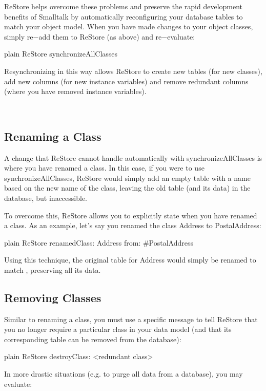 \documentclass[10pt,twoside,english]{_support/latex/sbabook/sbabook}
\begin{document}
ReStore helps overcome these problems and preserve the rapid development benefits of Smalltalk by automatically reconfiguring your database tables to match your object model. When you have made changes to your object classes, simply re−add them to ReStore (as above) and re−evaluate:

\begin{displaycode}{plain}
	ReStore synchronizeAllClasses
\end{displaycode}

Resynchronizing in this way allows ReStore to create new tables (for new classes), add new columns (for new instance variables) and remove redundant columns (where you have removed instance variables). 

 
\subsection{Renaming a Class}
A change that ReStore cannot handle automatically with synchronizeAllClasses is where you have renamed a class. In this case, if you were to use synchronizeAllClasses, ReStore would simply add an empty table with a name based on the new name of the class, leaving the old table (and its data) in the database, but inaccessible. 

To overcome this, ReStore allows you to explicitly state when you have renamed a class. As an example, let's say you renamed the class Address to PostalAddress:

\begin{displaycode}{plain}
	ReStore renamedClass: Address from: #PostalAddress
\end{displaycode}

Using this technique, the original table for Address would simply be renamed to match
, preserving all its data.
\subsection{Removing Classes}
Similar to renaming a class, you must use a specific message to tell ReStore that you no longer require a particular class in your data model (and that its corresponding table can be removed from the database):

\begin{displaycode}{plain}
	ReStore destroyClass: <redundant class>
\end{displaycode}

In more drastic situations (e.g. to purge all data from a database), you may evaluate:
\end{document}
